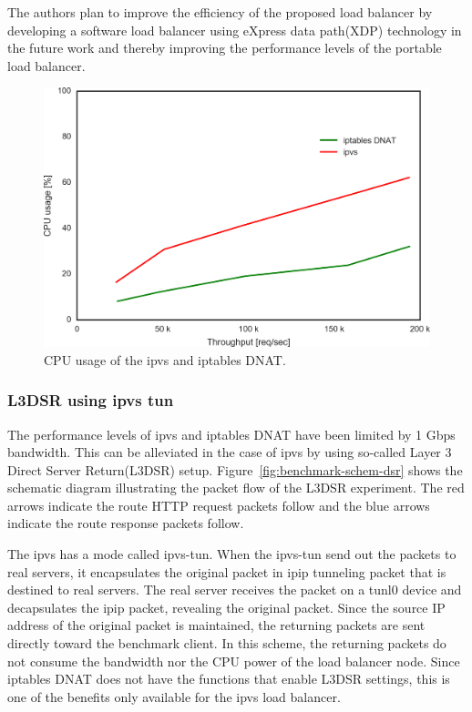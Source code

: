 The authors plan to improve the efficiency of the proposed load balancer by developing a software load balancer using eXpress data path(XDP) technology\cite{hoiland2018express} in the future work and thereby improving the performance levels of the portable load balancer.

\begin{figure}[h]
  \centering
  \includegraphics[width=0.8\columnwidth]{Figs/cpu_usage}
  \par\bigskip
  \centering
  \begin{minipage}{0.8\columnwidth}
    \caption{CPU usage of the ipvs and iptables DNAT.}
    \label{fig:cpu_usage}
  \end{minipage}
\end{figure}

\FloatBarrier

\subsubsection{L3DSR using ipvs tun}

The performance levels of ipvs and iptables DNAT have been limited by 1 Gbps bandwidth.
This can be alleviated in the case of ipvs by using so-called Layer 3 Direct Server Return(L3DSR) setup.
Figure~\ref{fig:benchmark-schem-dsr} shows the schematic diagram illustrating the packet flow of the L3DSR experiment.
The red arrows indicate the route HTTP request packets follow and the blue arrows indicate the route response packets follow.

The ipvs has a mode called ipvs-tun.
When the ipvs-tun send out the packets to real servers, it encapsulates the original packet in ipip tunneling packet that is destined to real servers.
The real server receives the packet on a tunl0 device and decapsulates the ipip packet, revealing the original packet.
Since the source IP address of the original packet is maintained, the returning packets are sent directly toward the benchmark client.
In this scheme, the returning packets do not consume the bandwidth nor the CPU power of the load balancer node.
Since iptables DNAT does not have the functions that enable L3DSR settings, this is one of the benefits only available for the ipvs load balancer.

